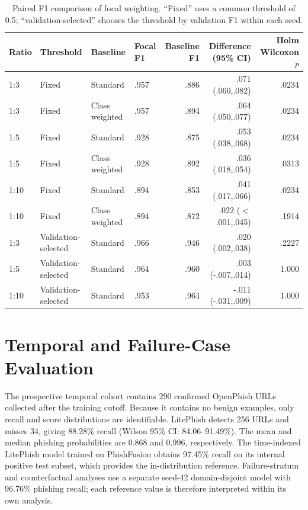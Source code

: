\documentclass[10pt]{article}
\begin{document}
\begin{table}[ht]
\centering
\caption{Paired F1 comparison of focal weighting. ``Fixed'' uses a common threshold of 0.5; ``validation-selected'' chooses the threshold by validation F1 within each seed.}
\label{tab:focal}
\begin{tabular}{llllrrr}
\toprule
Ratio & Threshold & Baseline & Focal F1 & Baseline F1 & Difference (95\% CI) & Holm Wilcoxon $p$ \\
\midrule
1:3 & Fixed & Standard & .957 & .886 & .071 (.060,.082) & .0234 \\
1:3 & Fixed & Class weighted & .957 & .894 & .064 (.050,.077) & .0234 \\
1:5 & Fixed & Standard & .928 & .875 & .053 (.038,.068) & .0234 \\
1:5 & Fixed & Class weighted & .928 & .892 & .036 (.018,.054) & .0313 \\
1:10 & Fixed & Standard & .894 & .853 & .041 (.017,.066) & .0234 \\
1:10 & Fixed & Class weighted & .894 & .872 & .022 ($<$.001,.045) & .1914 \\
1:3 & Validation-selected & Standard & .966 & .946 & .020 (.002,.038) & .2227 \\
1:5 & Validation-selected & Standard & .964 & .960 & .003 (-.007,.014) & 1.000 \\
1:10 & Validation-selected & Standard & .953 & .964 & -.011 (-.031,.009) & 1.000 \\
\bottomrule
\end{tabular}
\end{table}

\section{Temporal and Failure-Case Evaluation}

The prospective temporal cohort contains 290 confirmed OpenPhish URLs collected after the training cutoff. Because it contains no benign examples, only recall and score distributions are identifiable. LitePhish detects 256 URLs and misses 34, giving 88.28\% recall (Wilson 95\% CI: 84.06--91.49\%). The mean and median phishing probabilities are 0.868 and 0.996, respectively. The time-indexed LitePhish model trained on PhishFusion obtains 97.45\% recall on its internal positive test subset, which provides the in-distribution reference. {\color{supportingtext}Failure-stratum and counterfactual analyses use a separate seed-42 domain-disjoint model with 96.76\% phishing recall; each reference value is therefore interpreted within its own analysis.}
\end{document}
